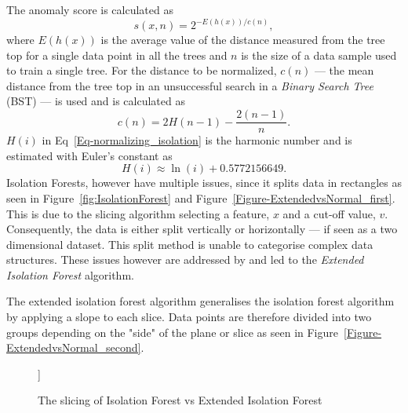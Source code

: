The anomaly score is calculated as
\begin{equation}
	s(x,n) = 2^{-E(h(x))/c(n)},
	\label{Eq-Isolation_anomaly}
\end{equation}
where $E(h(x))$ is the average value of the distance measured from the tree top for a single data point in all the trees \cite{Hariri2021} and $n$ is the size of a data sample used to train a single tree. For the distance to be normalized, $c(n)$ --- the mean distance from the tree top in an unsuccessful search in a \emph{Binary Search Tree} (BST) --- is used and is calculated as 
\begin{equation}
	c(n) = 2H(n-1) - \frac{2(n-1)}{n}.
	\label{Eq-normalizing_isolation}
\end{equation}
$H(i)$ in Eq~\ref{Eq-normalizing_isolation} is the harmonic number and is estimated with Euler's constant as 
\begin{equation}
	H(i) \approx \ln(i) + 0.5772156649.
	\label{Eq-H_i}
\end{equation}
Isolation Forests, however have multiple issues, since it splits data in rectangles as seen in Figure~\ref{fig:IsolationForest} and Figure~\ref{Figure-ExtendedvsNormal_first}. This is due to the slicing algorithm selecting a feature, $x$ and a cut-off value, $v$. Consequently, the data is either split vertically or horizontally --- if seen as a two dimensional dataset. This split method is unable to categorise complex data structures. These issues however are addressed by \cite{Hariri2021} and led to the \emph{Extended Isolation Forest} algorithm.

The extended isolation forest algorithm generalises the isolation forest algorithm by applying a slope to each slice. Data points are therefore divided into two groups depending on the "side" of the plane or slice as seen in Figure~\ref{Figure-ExtendedvsNormal_second}.

\begin{figure}[h!tb]
	\centering
	
	\quad
	]\
	\caption[Slicing of Isolation Forest]{The slicing of Isolation Forest vs Extended Isolation Forest}
	\label{Figure-ExtendedvsNormal}
\end{figure}

